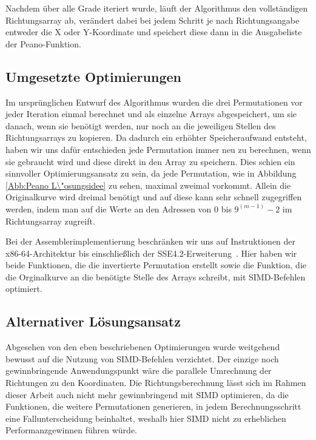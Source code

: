 \documentclass[course=asp]{aspdoc}
\begin{document}
Nachdem \"uber alle Grade iteriert wurde, l\"auft der Algorithmus den vollst\"andigen Richtungsarray ab, ver\"andert dabei bei jedem Schritt je nach Richtungsangabe entweder die X oder Y-Koordinate und speichert diese dann in die Ausgabeliste der Peano-Funktion.

\subsection{Umgesetzte Optimierungen} \label{Umgesetzte Optimierungen}

Im urspr\"unglichen Entwurf des Algorithmus wurden die drei Permutationen vor jeder Iteration einmal berechnet und als einzelne Arrays abgespeichert, um sie danach, wenn sie ben\"otigt werden, nur noch an die jeweiligen Stellen des Richtungsarrays zu kopieren. Da dadurch ein erh\"ohter Speicheraufwand entsteht, haben wir uns daf\"ur entschieden jede Permutation immer neu zu berechnen, wenn sie gebraucht wird und diese direkt in den Array zu speichern. Dies schien ein sinnvoller Optimierungsansatz zu sein, da jede Permutation, wie in Abbildung \ref{Abb:Peano L\"osungsidee} zu sehen, maximal zweimal vorkommt. Allein die Originalkurve wird dreimal ben\"otigt und auf diese kann sehr schnell zugegriffen werden, indem man auf die Werte an den Adressen von $0$ bis $9^{(m - 1)} - 2$ im Richtungsarray zugreift. 

Bei der Assemblerimplementierung beschr\"anken wir uns auf Instruktionen der x86-64-Architektur bis einschlie\ss lich der SSE4.2-Erweiterung~\cite{intel2020man}. Hier haben wir beide Funktionen, die die invertierte Permutation erstellt sowie die Funktion, die die Orginalkurve an die ben\"otigte Stelle des Arrays schreibt, mit SIMD-Befehlen optimiert. 


\subsection{Alternativer L\"osungsansatz} \label{Alternativer L\"osungsansatz}

Abgesehen von den eben beschriebenen Optimierungen wurde weitgehend bewusst auf die Nutzung von SIMD-Befehlen verzichtet. Der einzige noch gewinnbringende Anwendungspunkt w\"are die parallele Umrechnung der Richtungen zu den Koordinaten. Die Richtungsberechnung l\"asst sich im Rahmen dieser Arbeit auch nicht mehr gewinnbringend mit SIMD optimieren, da die Funktionen, die weitere Permutationen generieren, in jedem Berechnungsschritt eine Fallunterscheidung beinhaltet, weshalb hier SIMD nicht zu erheblichen Performanzgewinnen f\"uhren w\"urde. 
\end{document}
